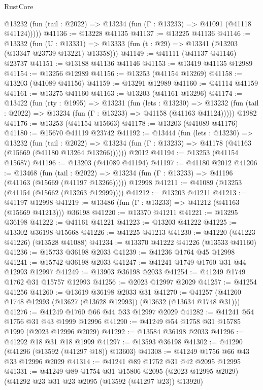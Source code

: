 \begin{lexlean}{RustCore}
\begin{coremodule}
      @13232 (fun (tail : @2022) => @13234 (fun (Γ : @13233) => @41091 (@41118 @41124)))))
@41136 := @13228 @41135
@41137 := @13225 @41136
@41146 := @13332
    (fun (U : @13331) => @13333 (fun (t : @29) => @13341 (@13203 (@13347 @23739 @13221) @13358)))
@41149 := @41111 (@41137 @41146) @23737
@41151 := @13188 @41136 @41146
@41153 := @13419 @41135 @12989
@41154 := @13256 @12989
@41156 := @13253 (@41154 @13269)
@41158 := @13203 (@41089 @41156)
@41159 := @13291 @12989
@41160 := @41114 @41159
@41161 := @13275 @41160
@41163 := @13203 (@41161 @13296)
@41174 := @13422
    (fun (rty : @1995) =>
    @13231
      (fun (lets : @13230) =>
      @13232 (fun (tail : @2022) => @13234 (fun (Γ : @13233) => @41158 (@41163 @41124)))))
    @1982
@41176 := @13253 (@41154 @15663)
@41178 := @13203 (@41089 @41176)
@41180 := @15670 @41119 @23742
@41192 := @13444
    (fun (lets : @13230) =>
    @13232
      (fun (tail : @2022) =>
      @13234 (fun (Γ : @13233) => @41178 (@41163 (@15669 (@41180 @13264 @13266))))))
    @2012
@41194 := @13253 (@41154 @15687)
@41196 := @13203 (@41089 @41194)
@41197 := @41180 @2012
@41206 := @13468
    (fun (tail : @2022) => @13234 (fun (Γ : @13233) => @41196 (@41163 (@15669 (@41197 @13266)))))
    @12998
@41211 := @41089 (@13253 (@41154 (@15662 (@13263 @12999))))
@41212 := @13203 @41211
@41213 := @41197 @12998
@41219 := @13486 (fun (Γ : @13233) => @41212 (@41163 (@15669 @41213))) @36198
@41220 := @13370 @41211
@41221 := @13295 @36198
@41222 := @41161 @41221
@41223 := @13203 @41222
@41225 := @13302 @36198 @15668
@41226 := @41225 @41213
@41230 := @41220 (@41223 @41226) (@13528 @41088)
@41234 := @13370 @41222 @41226 (@13533 @41160)
@41236 := @15733 @36198 @2033
@41239 := @41236 @1764 @45 @12998
@41241 := @15742 @36198 @2033
@41247 := @41241 @1749 @1760 @31 @44 @12993 @12997
@41249 := @13903 @36198 @2033
@41254 := @41249 @1749 @1762 @31 @15757 @12993
@41256 := @2023 @12997 @2029
@41257 := @41254 @41256
@41260 := @13619 @36198 @2033 @31
@41270 := @41257 (@41260 @1748 @12993 (@13627 (@13628 @12993)) (@13632 (@13634 @1748 @31)))
@41276 := @41249 @1760 @66 @44 @33 @12997 @2029
@41282 := @41241 @54 @1756 @31 @43 @1999 @12996
@41290 := @41249 @54 @1758 @31 @15785 @1999 (@2023 @12996 @2029)
@41292 := @13584 @36198 @2033
@41296 := @41292 @18 @31 @18 @1999
@41297 := @13593 @36198
@41302 := @41290 (@41296 (@13592 (@41297 @18)) @13603)
@41308 := @41249 @1756 @66 @43 @33 @12996 @2029
@41314 := @41241 @89 @1752 @31 @42 @2095 @12995
@41331 := @41249
    @89
    @1754
    @31
    @15806
    @2095
    (@2023 @12995 @2029)
    (@41292 @23 @31 @23 @2095 (@13592 (@41297 @23)) @13920)

\end{coremodule}
\end{lexlean}
